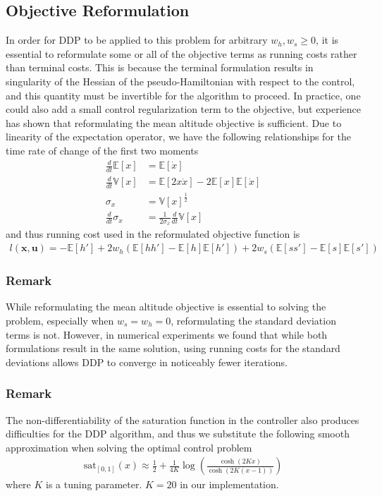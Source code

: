 \documentclass[journal ]{new-aiaa}
\newcommand{\state}{\ensuremath{\mathbf{x}}}
\newcommand{\control}{\ensuremath{\mathbf{u}}}
\newcommand{\E}[1]{\mathbb{E}\left[#1\right]}
\newcommand{\V}[1]{\mathbb{V}[#1]}
\begin{document}
\subsection*{Objective Reformulation}
In order for DDP to be applied to this problem for arbitrary $w_h,w_s\ge 0$, it is essential to reformulate some or all of the objective terms as running costs rather than terminal costs. This is because the terminal formulation results in singularity of the Hessian of the pseudo-Hamiltonian with respect to the control, and this quantity must be invertible for the algorithm to proceed. In practice, one could also add a small control regularization term to the objective, but experience has shown that reformulating the mean altitude objective is sufficient. Due to linearity of the expectation operator, we have the following relationships for the time rate of change of the first two moments
\begin{align}
\frac{d }{d t}\E{x} &= \E{\dot{x}} \\
\frac{d }{d t}\V{x} &= \E{2x\dot{x}} - 2\E{x}\E{\dot{x}} \\
\sigma_x &= \V{x}^{\frac{1}{2}} \\
\frac{d }{d t}\sigma_x &= \frac{1}{2\sigma_x}\frac{d }{d t}\V{x}
\end{align}
and thus running cost used in the reformulated objective function is 
\begin{align}
l(\state,\control) = -\E{h'} +  2w_h(\E{hh'}-\E{h}\E{h'}) + 2w_s(\E{ss'}-\E{s}\E{s'})
\end{align}

\subsubsection*{Remark} While reformulating the mean altitude objective is essential to solving the problem, especially when $w_s=w_h=0$, reformulating the standard deviation terms is not. However, in numerical experiments we found that while both formulations result in the same solution, using running costs for the standard deviations allows DDP to converge in noticeably fewer iterations.

\subsubsection*{Remark} The non-differentiability of the saturation function in the controller also produces difficulties for the DDP algorithm, and thus we substitute the following smooth approximation when solving the optimal control problem
\begin{align*}
\mathrm{sat}_{[0,1]}(x) \approx \frac{1}{2} + \frac{1}{4K}\log\left(\frac{\cosh (2Kx)}{\cosh (2K(x-1))}\right) 
\end{align*}
where $K$ is a tuning parameter. $K=20$ in our implementation.
\end{document}
